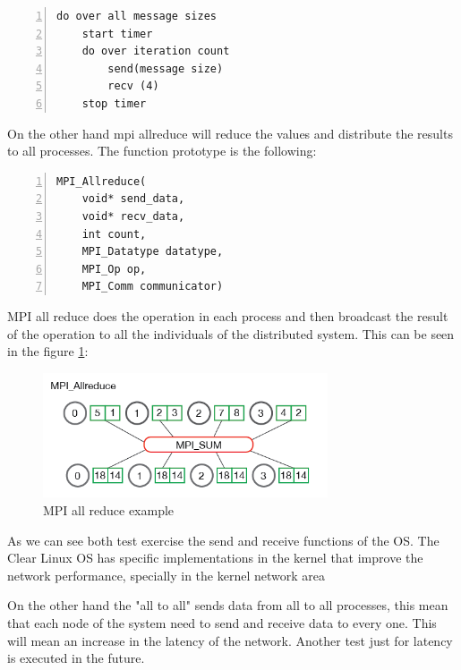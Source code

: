 \begin{lstlisting}[frame=single,numbers=left]
do over all message sizes 
    start timer
    do over iteration count 
        send(message size) 
        recv (4)
    stop timer
\end{lstlisting}

On the other hand mpi allreduce will reduce the values and distribute the
results to all processes. The function prototype is the following:

\begin{lstlisting}[frame=single,numbers=left]
MPI_Allreduce(
    void* send_data,
    void* recv_data,
    int count,
    MPI_Datatype datatype,
    MPI_Op op,
    MPI_Comm communicator)
\end{lstlisting}

MPI all reduce does the operation in each process and then broadcast the result
of the operation to all the individuals of the distributed system. This can be
seen in the figure \ref{mpi_allreduce_example}: 

\begin{figure}[H]
\centering
\includegraphics[width=0.75\textwidth]{images/mpi_allreduce_1.png}
\caption{MPI all reduce example }
\label{mpi_allreduce_example}
\end{figure}

As we can see both test exercise the send and receive functions of the OS. The
Clear Linux OS has specific implementations in the kernel that improve the
network performance, specially in the kernel network area

On the other hand the "all to all" sends data from all to all processes, this
mean that each node of the system need to send and receive data to every one.
This will mean an increase in the latency of the network. Another test just for
latency is executed in the future. 


